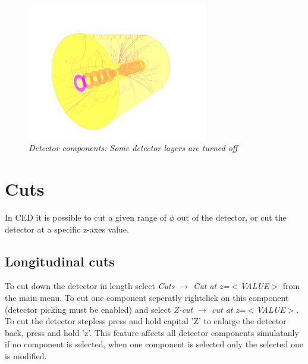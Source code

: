 \documentclass[a4paper,10pt]{article}
\begin{document}
\begin{figure}
\centerline{\includegraphics[height=6cm]{img/detector_layer.png}}
\caption{\label{detectorlayer} \textsl{Detector components: Some detector layers are turned off}}
\end{figure}

\section{Cuts}
In CED it is possible to cut a given range of $\phi$ out of the detector, or cut the detector at a specific z-axes value.

\subsection{Longitudinal cuts}
To cut down the detector in length select \textit{Cuts $\to$ Cut at z=$<$VALUE$>$} from the main menu.
To cut one component seperatly rightclick on this component (detector picking must be enabled) and select \textit{Z-cut $\to$ cut at z=$<$VALUE$>$}. 
To cut the detector stepless press and hold capital 'Z' to enlarge the detector back, press and hold 'z'.
This feature affects all detector components simulatanly if no component is selected, when one component is selected only the selected one is modified.
\end{document}
